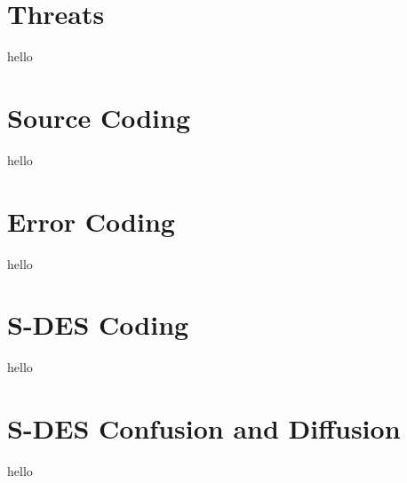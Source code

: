 \documentclass[]{article}
\begin{document}
\vspace*{0.8cm}
\section*{Threats}

hello \\

\section*{Source Coding}

hello \\

\section*{Error Coding}

hello \\

\section*{S-DES Coding}

hello \\

\section*{S-DES Confusion and Diffusion}

hello \\

\pagebreak













\end{document}
